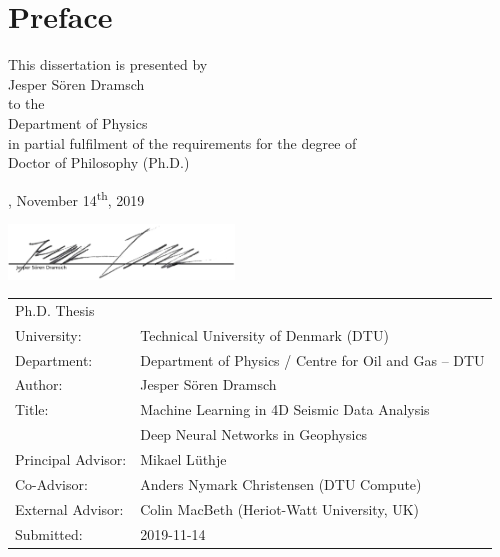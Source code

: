 \chapter{Preface}
\vspace*{1cm}
{\centering
\sffamily
This dissertation is presented by\\[3mm]
{\large Jesper S{\"o}ren Dramsch}\\[3mm]
to the\\[3mm]
{\large Department of Physics}\\[3mm]
in partial fulfilment of the requirements for the degree of\\[3mm]
{\large Doctor of Philosophy (Ph.D.)}\\[3mm]

\vfill

    \thesislocation{}, November 14\textsuperscript{th}, 2019\\[1cm]
\begin{flushright}
    \includegraphics[width=0.45\textwidth]{graphics/Unterschrift.png}\\[1cm]
\end{flushright}
}
\clearpage
\newpage
\vspace*{3cm}
{\sffamily
\begin{tabular}{ll}
Ph.D. Thesis & \\[1mm]
University: & Technical University of Denmark (DTU)  \\[1mm]
Department: & Department of Physics / Centre for Oil and Gas -- DTU \\[1mm]
Author: & Jesper S{\"o}ren Dramsch \\[1mm]
Title: & Machine Learning in 4D Seismic Data Analysis\\[1mm]
       &Deep Neural Networks in Geophysics \\[1mm]
Principal Advisor: \hspace{1cm} & Mikael L{\"u}thje \\[1mm]
Co-Advisor: & Anders Nymark Christensen (DTU Compute) \\[1mm]
External Advisor: & Colin MacBeth (Heriot-Watt University, UK) \\[1mm]
Submitted: & 2019-11-14 
\end{tabular}
}